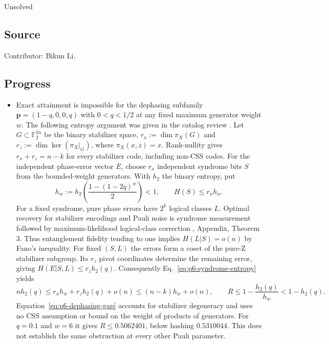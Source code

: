 Unsolved

\subsection*{Source}

Contributor: Bikun Li.

\subsection*{Progress}

\begin{itemize}
  \item Exact attainment is impossible for the dephasing subfamily
$\mathbf p=(1-q,0,0,q)$ with $0<q<1/2$ at any fixed maximum generator
weight $w$. The following entropy argument was given in the catalog review
. Let $G\subset\mathbb F_2^{2n}$ be the
binary stabilizer space, $r_x:=\dim\pi_X(G)$ and
$r_z:=\dim\ker(\pi_X|_G)$, where $\pi_X(x,z)=x$. Rank-nullity gives
$r_x+r_z=n-k$ for every stabilizer code, including non-CSS codes. For the
independent phase-error vector $E$, choose $r_x$ independent syndrome bits
$S$ from the bounded-weight generators. With $h_2$ the binary entropy, put
\begin{equation}
  h_w:=h_2\!\left(\frac{1-(1-2q)^w}{2}\right)<1,
  \qquad H(S)\le r_x h_w.
  \label{eq:p6-syndrome-entropy}
\end{equation}
For a fixed syndrome, pure phase errors have $2^k$ logical classes $L$.
Optimal recovery for stabilizer encodings and Pauli noise is syndrome
measurement followed by maximum-likelihood logical-class correction
, Appendix, Theorem 3.
Thus entanglement fidelity tending to one implies $H(L|S)=o(n)$ by Fano's
inequality. For fixed $(S,L)$ the errors form a coset of the pure-Z
stabilizer subgroup. Its $r_z$ pivot coordinates determine the remaining
error, giving $H(E|S,L)\le r_z h_2(q)$. Consequently Eq.~\eqref{eq:p6-syndrome-entropy}
yields
\begin{equation}
  nh_2(q)\le r_xh_w+r_zh_2(q)+o(n)\le(n-k)h_w+o(n),
  \qquad R\le1-\frac{h_2(q)}{h_w}<1-h_2(q).
  \label{eq:p6-dephasing-gap}
\end{equation}
Equation~\eqref{eq:p6-dephasing-gap} accounts for stabilizer degeneracy and
uses no CSS assumption or bound on the weight of products of generators.
For $q=0.1$ and $w=6$ it gives $R\le0.5062401$, below hashing
$0.5310044$. This does not establish the same obstruction at every other
Pauli parameter.


\end{itemize}
